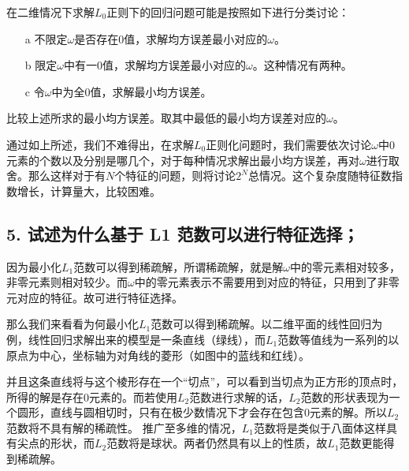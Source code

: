 \documentclass{article}
\begin{document}


在二维情况下求解$L_0$正则下的回归问题可能是按照如下进行分类讨论：
\begin{itemize}
\item[a]
不限定$\omega$是否存在0值，求解均方误差最小对应的$\omega$。
\item[b]
限定$\omega$中有一0值，求解均方误差最小对应的$\omega$。这种情况有两种。
\item[c]
令$\omega$中为全0值，求解最小均方误差。
\end{itemize}

比较上述所求的最小均方误差。取其中最低的最小均方误差对应的$\omega$。

通过如上所述，我们不难得出，在求解$L_0$正则化问题时，我们需要依次讨论$\omega$中0元素的个数以及分别是哪几个，对于每种情况求解出最小均方误差，再对$\omega$进行取舍。那么这样对于有$N$个特征的问题，则将讨论$2^N$总情况。这个复杂度随特征数指数增长，计算量大，比较困难。
\subsection*{5. 试述为什么基于 L1 范数可以进行特征选择；}
因为最小化$L_1$范数可以得到稀疏解，所谓稀疏解，就是解$\omega$中的零元素相对较多，非零元素则相对较少。而$\omega$中的零元素表示不需要用到对应的特征，只用到了非零元对应的特征。故可进行特征选择。

那么我们来看看为何最小化$L_1$范数可以得到稀疏解。以二维平面的线性回归为例，线性回归求解出来的模型是一条直线（绿线），而$L_1$范数等值线为一系列的以原点为中心，坐标轴为对角线的菱形（如图中的蓝线和红线）。

并且这条直线将与这个棱形存在一个“切点”，可以看到当切点为正方形的顶点时，所得的解是存在0元素的。而若使用$L_2$范数进行求解的话，$L_2$范数的形状表现为一个圆形，直线与圆相切时，只有在极少数情况下才会存在包含0元素的解。所以$L_2$范数将不具有解的稀疏性。
推广至多维的情况，$L_1$范数将是类似于八面体这样具有尖点的形状，而$L_2$范数将是球状。两者仍然具有以上的性质，故$L_1$范数更能得到稀疏解。

\end{document}
